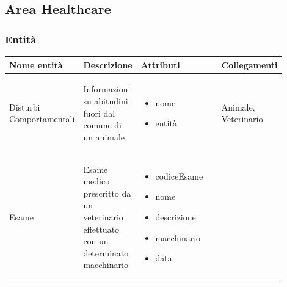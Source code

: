 \documentclass[12pt,a4paper]{article}
\begin{document}
\begin{center}
\begin{longtable}{|p{0.16\linewidth}|p{0.24\linewidth}|p{0.50\linewidth}|}
\hline

\end{longtable}
\end{center}
\pagebreak
\subsection{Area Healthcare}
\subsubsection{Entità}
\label{Healthcare Entita}
\begin{center}
\setlength{\extrarowheight}{1.5pt}
\begin{longtable}{|p{0.14\linewidth}|p{0.20\linewidth}|p{0.36\linewidth}|p{0.20\linewidth}|}
\hline 
\textbf{Nome entità} 	& \textbf{Descrizione} & \textbf{Attributi} & \textbf{Collegamenti}\\ 

    
\hline

Disturbi Comportamentali				 	& \begin{flushleft}\vspace{-15pt} Informazioni su abitudini fuori dal comune di un animale \end{flushleft}
					& \begin{itemize}
						\setlength{\itemindent}{-1em}
						\vspace{-25pt}
						\setlength\itemsep{-0.25em}
						\item nome
						\item entità
					\end{itemize}
					& \begin{flushleft}\vspace{-25pt} Animale, Veterinario \end{flushleft} \\ 

\hline
Esame				 	& \begin{flushleft}\vspace{-25pt} Esame medico prescritto da un veterinario effettuato con un determinato macchinario \end{flushleft}
					& \begin{itemize}
						\setlength{\itemindent}{-1em}
						\vspace{-25pt}
						\setlength\itemsep{-0.25em}
						\item codiceEsame
						\item nome
						\item descrizione
						\item macchinario
						\item data
						

\end{itemize}
\end{longtable}
\end{center}
\end{document}
